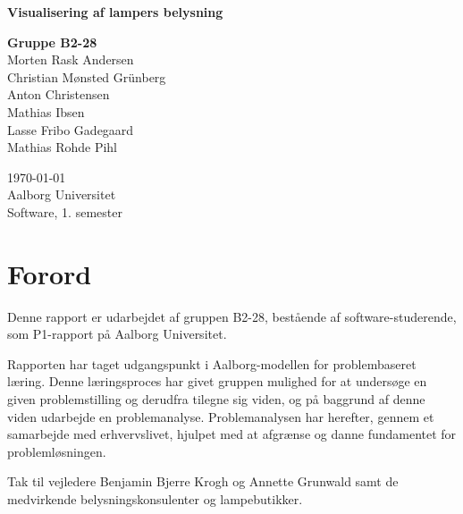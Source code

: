 \begin{titlepage}
  \vspace{0.2cm}
  \begin{center}
    \Huge{\textbf{Visualisering af lampers belysning}}
  \end{center}
  \vspace{0.2cm}
  \begin{center}
    \Large{\textbf{Gruppe B2-28}}\\
	Morten Rask Andersen\\
	Christian Mønsted Grünberg\\
	Anton Christensen\\
	Mathias Ibsen\\
	Lasse Fribo Gadegaard\\
	Mathias Rohde Pihl
  \end{center}
  \vfill
  \begin{center}
 	\today\\
    Aalborg Universitet\\
    Software, 1. semester
  \end{center}
\end{titlepage}



\section{Forord}
Denne rapport er udarbejdet af gruppen B2-28, bestående af software-studerende, som P1-rapport på Aalborg Universitet.

Rapporten har taget udgangspunkt i Aalborg-modellen for problembaseret læring. Denne læringsproces har givet gruppen mulighed for at undersøge en given problemstilling og derudfra tilegne sig viden, og på baggrund af denne viden udarbejde en problemanalyse. Problemanalysen har herefter, gennem et samarbejde med erhvervslivet, hjulpet med at afgrænse og danne fundamentet for problemløsningen.

Tak til vejledere Benjamin Bjerre Krogh og Annette Grunwald samt de medvirkende belysningskonsulenter og lampebutikker.









\clearpage